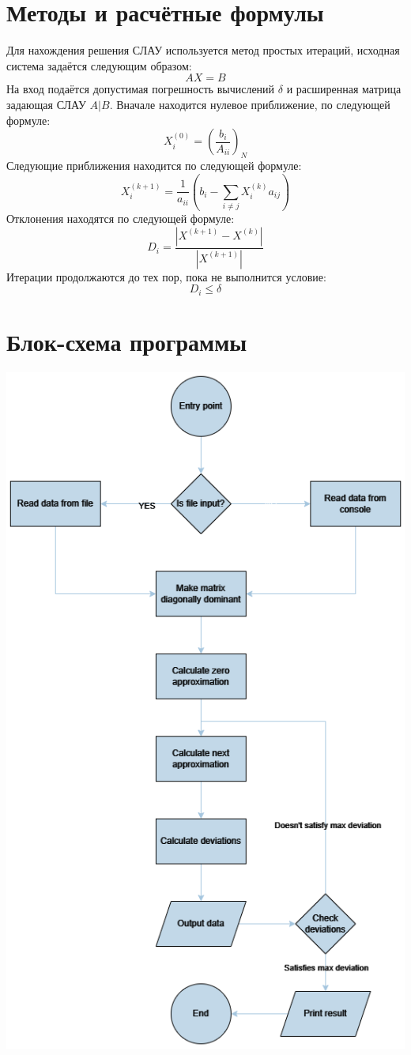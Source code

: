 \documentclass[12pt,a4paper]{report}
\begin{document}
\section*{Методы и расчётные формулы}
Для нахождения решения СЛАУ используется метод простых итераций, исходная система задаётся следующим образом:
$$AX=B$$
На вход подаётся допустимая погрешность вычислений $\delta$ и расширенная матрица задающая СЛАУ $A|B$. Вначале находится нулевое приближение, по следующей формуле:
$$X^{(0)}_i=(\frac{b_i}{A_{ii}})_{N}$$
Следующие приближения находится по следующей формуле:
$$X^{(k+1)}_i=\frac{1}{a_{ii}}(b_i -\sum_{i\not=j}X^{(k)}_ia_{ij}) $$
Отклонения находятся по следующей формуле:
$$D_i=\frac{ |X^{(k+1)} - X^{(k)}| }{|X^{(k+1)}|}$$
Итерации продолжаются до тех пор, пока не выполнится условие:
$$D_i \leq \delta$$
\section*{Блок-схема программы}
\includegraphics[width=\textwidth]{schema.png}
\end{document}

